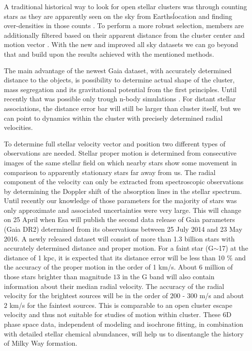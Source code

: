 A traditional historical way to look for open stellar clusters was through counting stars as they are apparently seen on the sky from Earths\' location and finding over-densities in those counts \citep{1988AJ.....95..108L, 2014A&A...568A..51S}. To perform a more robust selection, members are additionally filtered based on their apparent distance from the cluster center and motion vector \citep{2017A&A...601A..19G}. With the new and improved all sky datasets we can go beyond that and build upon the results achieved with the mentioned methods. 


The main advantage of the newest Gaia dataset, with accurately determined distance to the objects, is possibility to determine actual shape of the cluster, mass segregation and its gravitational potential from the first principles. Until recently that was possible only trough n-body simulations \citep{1987MNRAS.224..193T, 2016MNRAS.456.3757S, 2018MNRAS.473..849D}. For distant stellar associations, the distance error bar will still be larger than cluster itself, but we can point to dynamics within the cluster with precisely determined radial velocities. 

To determine full stellar velocity vector and position two different types of observations are needed. Stellar proper motion is determined from consecutive images of the same stellar field on which nearby stars show some movement in comparison to apparently stationary stars far away from us. The radial component of the velocity can only be extracted from spectroscopic observations by determining the Doppler shift of the absorption lines in the stellar spectrum. Until recently our knowledge of those parameters for the majority of stars was only approximate and associated uncertainties were very large. This will change on 25 April when Esa will publish the second data release of Gaia \cite{2001A&A...369..339P, 2008IAUS..248..217L, 2015A&A...576A..74D} parameters (Gaia DR2) determined from its observations between 25 July 2014 and 23 May 2016. A newly released dataset will consist of more than 1.3 billion stars with accurately determined distance and proper motion. For a faint star (G$\sim$17) at the distance of 1 kpc, it is expected that its distance error will be less than 10 \% and the accuracy of the proper motion in the order of 1 km/s. About 6 million of those stars brighter than magnitude $13$ in the G band will also contain information about their median radial velocity. The accuracy of the radial velocity for the brightest sources will be in the order of $200$ - $300$ m/s and about $2$ km/s for the faintest sources. This is comparable to an open cluster escape velocity and thus not suitable for studies of motion within cluster. These 6D phase space data, independent of modeling and isochrone fitting, in combination with detailed stellar chemical abundances, will help us to disentangle the history of Milky Way formation.

